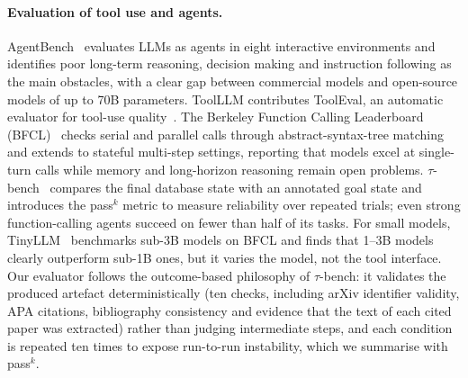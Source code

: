 \paragraph{Evaluation of tool use and agents.}
AgentBench~\citep{liu2024agentbench} evaluates LLMs as agents in eight interactive environments and identifies poor long-term reasoning, decision making and instruction following as the main obstacles, with a clear gap between commercial models and open-source models of up to 70B parameters. ToolLLM contributes ToolEval, an automatic evaluator for tool-use quality~\citep{qin2024toolllm}. The Berkeley Function Calling Leaderboard (BFCL)~\citep{patil2025bfcl} checks serial and parallel calls through abstract-syntax-tree matching and extends to stateful multi-step settings, reporting that models excel at single-turn calls while memory and long-horizon reasoning remain open problems. $\tau$-bench~\citep{yao2024taubench} compares the final database state with an annotated goal state and introduces the pass$^k$ metric to measure reliability over repeated trials; even strong function-calling agents succeed on fewer than half of its tasks. For small models, TinyLLM~\citep{haque2025tinyllm} benchmarks sub-3B models on BFCL and finds that 1--3B models clearly outperform sub-1B ones, but it varies the model, not the tool interface. Our evaluator follows the outcome-based philosophy of $\tau$-bench: it validates the produced artefact deterministically (ten checks, including arXiv identifier validity, APA citations, bibliography consistency and evidence that the text of each cited paper was extracted) rather than judging intermediate steps, and each condition is repeated ten times to expose run-to-run instability, which we summarise with pass$^k$.

